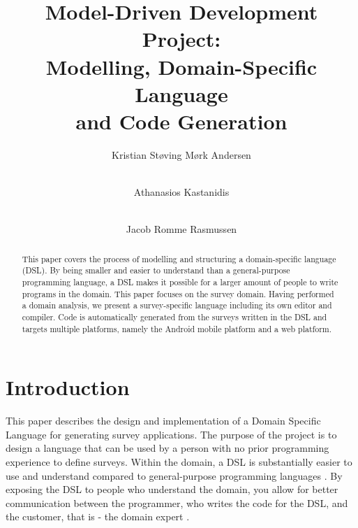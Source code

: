 \documentclass[runningheads]{llncs}
\begin{document}
\mainmatter  %

\title{Model-Driven Development Project:\\ Modelling, Domain-Specific Language\\ and Code Generation}


\author{Kristian Støving Mørk Andersen \and \\ Athanasios Kastanidis \and \\ Jacob Romme Rasmussen}
%

\institute{\mailsa\\}

\maketitle


\begin{abstract}
This paper covers the process of modelling and structuring a domain-specific language (DSL). By being smaller and easier to understand than a general-purpose programming language, a DSL makes it possible for a larger amount of people to write programs in the domain. This paper focuses on the survey domain. Having performed a domain analysis, we present a survey-specific language including its own editor and compiler. Code is automatically generated from the surveys written in the DSL and targets multiple platforms, namely the Android mobile platform and a web platform. 
\end{abstract}

\section{Introduction}
This paper describes the design and implementation of a Domain Specific Language for generating survey applications. The purpose of the project is to design a language that can be used by a person with no prior programming experience to define surveys. Within the domain, a DSL is substantially easier to use and understand compared to general-purpose programming languages \cite{mernik}. By exposing the DSL to people who understand the domain, you allow for better communication between the programmer, who writes the code for the DSL, and the customer, that is - the domain expert \cite{fowler}. 
\end{document}
